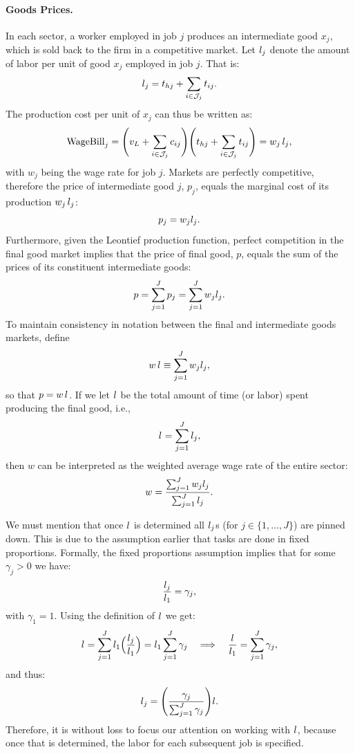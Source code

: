 \documentclass{article}
\theoremstyle{plain}
\theoremstyle{plain}
\begin{document}
\paragraph{Goods Prices.}  
In each sector, a worker employed in job $j$ produces an intermediate good $x_j$, which is sold back to the firm in a competitive market.  
Let $l_{j}$ denote the amount of labor per unit of good $x_j$ employed in job $j$.
That is:  
\[
l_{j} = t_{hj} + \sum_{i \in \mathcal{J}_j} t_{ij}.
\]  
The production cost per unit of $x_j$ can thus be written as:  
\[
\text{WageBill}_j = \Biggl(v_L + \sum_{i \in \mathcal{J}_j} c_{ij} \Biggr) \Biggl(t_{hj} + \sum_{i \in \mathcal{J}_j} t_{ij} \Biggr) = w_j \,l_{j},
\]  
with $w_j$ being the wage rate for job $j$.
Markets are perfectly competitive, therefore the price of intermediate good $j$, $p_j$, equals the marginal cost of its production $w_j\,l_{j}$:
\[
p_j = w_j l_{j}.
\]  
Furthermore, given the Leontief production function, perfect competition in the final good market implies that the price of final good, $p$, equals the sum of the prices of its constituent intermediate goods:
\[
p = \sum_{j=1}^J p_j = \sum_{j=1}^J w_j l_{j}.
\]  
To maintain consistency in notation between the final and intermediate goods markets, define  
\[
w \, l_{} \equiv \sum_{j=1}^J w_j l_{j},
\]
so that $p = w \, l_{}$.  
If we let $l_{}$ be the total amount of time (or labor) spent producing the final good, i.e.,
\[
l_{} = \sum_{j=1}^J l_{j},
\]
then $w$ can be interpreted as the weighted average wage rate of the entire sector:
\[
w = \frac{\sum_{j=1}^J w_j l_{j}}{\sum_{j=1}^J l_{j}}.
\]

We must mention that once $l_{}$ is determined all $l_{j}$s (for $j \in \{1,\ldots,J\}$) are pinned down.
This is due to the assumption earlier that tasks are done in fixed proportions.
Formally, the fixed proportions assumption implies that for some $\gamma_j > 0$ we have:  
\[
\frac{l_{j}}{l_{1}} = \gamma_j,
\]  
with $\gamma_1 = 1$.  
Using the definition of $l_{}$ we get: 
\[
l_{} = \sum_{j=1}^J l_{1} \Bigl(\frac{l_{j}}{l_{1}} \Bigr) = l_{1} \sum_{j=1}^J \gamma_j 
\quad 
\Longrightarrow
\quad 
\frac{l_{}}{l_{1}} = \sum_{j=1}^J \gamma_j,
\]  
and thus:  
\[
l_{j} = \Bigg( \frac{\gamma_j}{\sum_{j=1}^J \gamma_j} \Bigg) l_{}.
\]  
Therefore, it is without loss to focus our attention on working with $l_{}$, because once that is determined, the labor for each subsequent job is specified.
\end{document}

